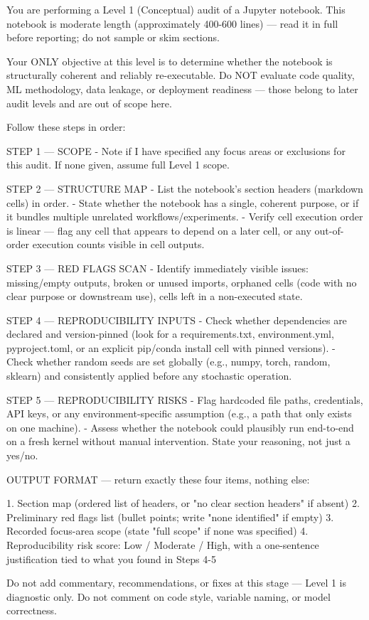 \documentclass[11pt, a4paper]{article}
\begin{document}
{\small\sffamily

You are performing a Level 1 (Conceptual) audit of a Jupyter notebook.
This notebook is moderate length (approximately 400-600 lines) — read
it in full before reporting; do not sample or skim sections.

Your ONLY objective at this level is to determine whether the notebook
is structurally coherent and reliably re-executable. Do NOT evaluate
code quality, ML methodology, data leakage, or deployment readiness —
those belong to later audit levels and are out of scope here.

Follow these steps in order:

STEP 1 — SCOPE
- Note if I have specified any focus areas or exclusions for this audit.
If none given, assume full Level 1 scope.

STEP 2 — STRUCTURE MAP
- List the notebook's section headers (markdown cells) in order.
- State whether the notebook has a single, coherent purpose, or if it
bundles multiple unrelated workflows/experiments.
- Verify cell execution order is linear — flag any cell that appears to
depend on a later cell, or any out-of-order execution counts visible
in cell outputs.

STEP 3 — RED FLAGS SCAN
- Identify immediately visible issues: missing/empty outputs, broken or
unused imports, orphaned cells (code with no clear purpose or downstream
use), cells left in a non-executed state.

STEP 4 — REPRODUCIBILITY INPUTS
- Check whether dependencies are declared and version-pinned (look for
a requirements.txt, environment.yml, pyproject.toml, or an explicit
pip/conda install cell with pinned versions).
- Check whether random seeds are set globally (e.g., numpy, torch,
random, sklearn) and consistently applied before any stochastic
operation.

STEP 5 — REPRODUCIBILITY RISKS
- Flag hardcoded file paths, credentials, API keys, or any
environment-specific assumption (e.g., a path that only exists on
one machine).
- Assess whether the notebook could plausibly run end-to-end on a
fresh kernel without manual intervention. State your reasoning,
not just a yes/no.

OUTPUT FORMAT — return exactly these four items, nothing else:

1. Section map (ordered list of headers, or "no clear section headers"
if absent)
2. Preliminary red flags list (bullet points; write "none identified"
if empty)
3. Recorded focus-area scope (state "full scope" if none was specified)
4. Reproducibility risk score: Low / Moderate / High, with a
one-sentence justification tied to what you found in Steps 4-5

Do not add commentary, recommendations, or fixes at this stage —
Level 1 is diagnostic only. Do not comment on code style, variable
naming, or model correctness.

}
\end{document}

